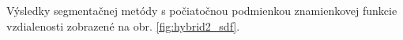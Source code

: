 \documentclass[a4paper,11pt,oneside]{article}%
\begin{document}
Výsledky segmentačnej metódy s počiatočnou podmienkou znamienkovej funkcie vzdialenosti zobrazené na obr. \ref{fig:hybrid2_sdf}.

\begin{figure}[H]  
    \hspace{5px}

\end{figure}
\end{document}
